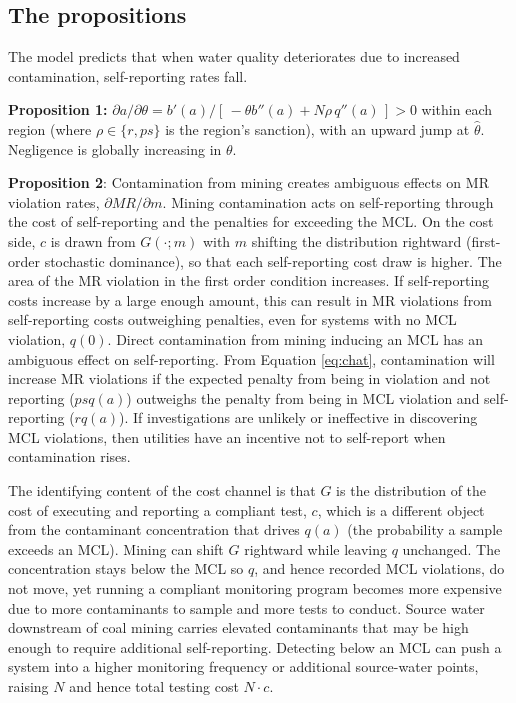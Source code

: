 \documentclass{article}
\begin{document}
\subsection{The propositions}

The model predicts that when water quality deteriorates due to increased contamination, self-reporting rates fall.

\textbf{Proposition 1:} $\partial a/\partial\theta = b'(a) / [\,-\theta b''(a) + N\rho\, q''(a)\,] > 0$ within each region (where $\rho \in \{r, ps\}$ is the region's sanction), with an upward jump at $\hat{\theta}$. Negligence is globally increasing in $\theta$.

\textbf{Proposition 2}: Contamination from mining creates ambiguous effects on MR violation rates, $\partial MR/\partial m$.
Mining contamination acts on self-reporting through the cost of self-reporting and the penalties for exceeding the MCL. On the cost side, $c$ is drawn from $G(\cdot;m)$ with $m$ shifting the distribution rightward (first-order stochastic dominance), so that each self-reporting cost draw is higher. The area of the MR violation in the first order condition increases. If self-reporting costs increase by a large enough amount, this can result in MR violations from self-reporting costs outweighing penalties, even for systems with no MCL violation, $q(0)$.
Direct contamination from mining inducing an MCL has an ambiguous effect on self-reporting. From Equation \ref{eq:chat}, contamination will increase MR violations if the expected penalty from being in violation and not reporting ($psq(a)$) outweighs the penalty from being in MCL violation and self-reporting ($rq(a)$). If investigations are unlikely or ineffective in discovering MCL violations, then utilities have an incentive not to self-report when contamination rises.

The identifying content of the cost channel is that $G$ is the distribution of the cost of executing and reporting a compliant test, $c$, which is a different object from the contaminant concentration that drives $q(a)$ (the probability a sample exceeds an MCL). Mining can shift $G$ rightward while leaving $q$ unchanged. The concentration stays below the MCL so $q$, and hence recorded MCL violations, do not move, yet running a compliant monitoring program becomes more expensive due to more contaminants to sample and more tests to conduct. Source water downstream of coal mining carries elevated contaminants that may be high enough to require additional self-reporting. Detecting below an MCL can push a system into a higher monitoring frequency or additional source-water points, raising $N$ and hence total testing cost $N\cdot c$.
\end{document}
